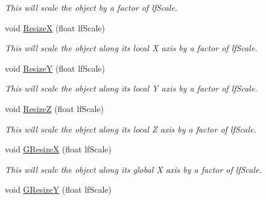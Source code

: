 \begin{DoxyCompactItemize}
\begin{DoxyCompactList}\small\item\em This will scale the object by a factor of lfScale. \end{DoxyCompactList}\item 
\hypertarget{classc_matrix4_a6f721212ba596c5e80f85eba5b70766d}{
void \hyperlink{classc_matrix4_a6f721212ba596c5e80f85eba5b70766d}{ResizeX} (float lfScale)}
\label{classc_matrix4_a6f721212ba596c5e80f85eba5b70766d}

\begin{DoxyCompactList}\small\item\em This will scale the object along its local X axis by a factor of lfScale. \end{DoxyCompactList}\item 
\hypertarget{classc_matrix4_a77ef7c3392fd4d02ddfa4d206f91265b}{
void \hyperlink{classc_matrix4_a77ef7c3392fd4d02ddfa4d206f91265b}{ResizeY} (float lfScale)}
\label{classc_matrix4_a77ef7c3392fd4d02ddfa4d206f91265b}

\begin{DoxyCompactList}\small\item\em This will scale the object along its local Y axis by a factor of lfScale. \end{DoxyCompactList}\item 
\hypertarget{classc_matrix4_ac2789d9134f4b599f3f79f7b89c05af1}{
void \hyperlink{classc_matrix4_ac2789d9134f4b599f3f79f7b89c05af1}{ResizeZ} (float lfScale)}
\label{classc_matrix4_ac2789d9134f4b599f3f79f7b89c05af1}

\begin{DoxyCompactList}\small\item\em This will scale the object along its local Z axis by a factor of lfScale. \end{DoxyCompactList}\item 
\hypertarget{classc_matrix4_ac2be3e4653b0c8324c6a505e54544043}{
void \hyperlink{classc_matrix4_ac2be3e4653b0c8324c6a505e54544043}{GResizeX} (float lfScale)}
\label{classc_matrix4_ac2be3e4653b0c8324c6a505e54544043}

\begin{DoxyCompactList}\small\item\em This will scale the object along its global X axis by a factor of lfScale. \end{DoxyCompactList}\item 
\hypertarget{classc_matrix4_a13fda6e0dc1b19f7f136c1963bbdac77}{
void \hyperlink{classc_matrix4_a13fda6e0dc1b19f7f136c1963bbdac77}{GResizeY} (float lfScale)}
\label{classc_matrix4_a13fda6e0dc1b19f7f136c1963bbdac77}


\end{DoxyCompactItemize}

